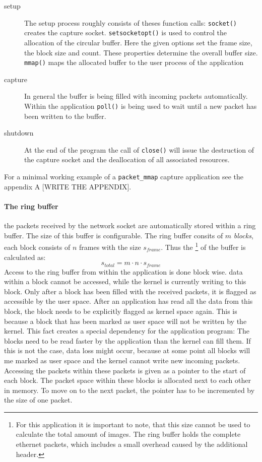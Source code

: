 \begin{description}
\item[setup] The setup process roughly consists of theses function calls: \texttt{socket()} creates the capture socket. \texttt{setsocketopt()} is used to control the allocation of the circular buffer. Here the given options set the frame size, the block size  and count. These properties determine the overall buffer size. \texttt{mmap()} maps the allocated buffer to the user process of the application
\item[capture] In general the buffer is being filled with incoming packets automatically. Within the application \texttt{poll()} is being used to wait until a new packet has been written to the buffer.
\item[shutdown] At the end of the program the call of \texttt{close()} will issue the destruction of the capture socket and the deallocation of all associated resources.
\end{description}

For a minimal working example of a \texttt{packet\_mmap} capture application see the appendix A [WRITE THE APPENDIX].\par 

\paragraph{The ring buffer}

the packets received by the network socket are automatically stored within a ring buffer. The size of this buffer is configurable. The ring buffer consits of $m$ \textit{blocks}, each block consists of $n$ frames with the size $s_{frame}$. Thus the \footnote{For this application it is important to note, that this size cannot be used to calculate the total amount of images. The ring buffer holds the complete ethernet packets, which includes a small overhead caused by the additional header.} of the buffer is calculated as:
\[
s_{total} = m \cdot n \cdot s_{frame}
\]
Access to the ring buffer from within the application is done block wise. data within a block cannot be accessed, while the kernel is currently writing to this block. Only after a block has been filled with the received packets, it is flagged as accessible by the user space. After an application has read all the data from this block, the block needs to be explicitly flagged as kernel space again. This is because a block that has been marked as user space will not be written by the kernel. This fact creates a special dependency for the application program: The blocks need to be read faster by the application than the kernel can fill them. If this is not the case, data loss might occur, because at some point all blocks will me marked as user space and the kernel cannot write new incoming packets.\\
Accessing the packets within these packets is given as a pointer to the start of each block. The packet space within these blocks is allocated next to each other in memory. To move on to the next packet, the pointer has to be incremented by the size of one packet.

